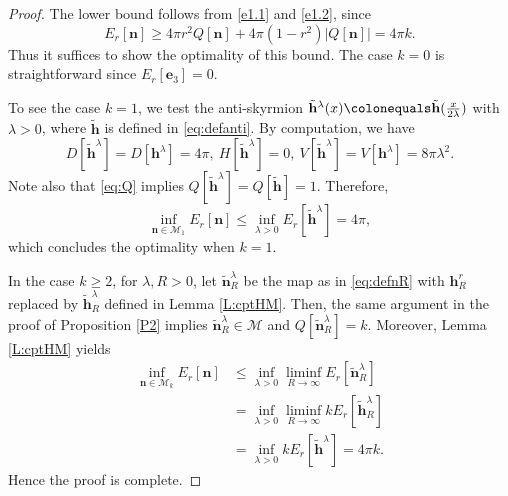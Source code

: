 \documentclass{amsart}
\numberwithin{equation}{section}
\theoremstyle{definition}
\theoremstyle{remark}
\newcommand{\boM}{\mathcal{M}}
\newcommand{\la}{\ensuremath{\lambda}}
\newcommand{\te}{\ensuremath{\theta}}
\newcommand{\bh}{{\mathbf{h}}}
\newcommand{\bn}{{\mathbf{n}}}
\newcommand{\boe}{{\mathbf{e}}}
\begin{document}
\begin{proof}
The lower bound follows from 
\eqref{e1.1} and \eqref{e1.2}, since
$$
E_r[\bn] \ge 4\pi r^2 Q[\bn] + 4\pi (1-r^2) |Q[\bn]| = 4\pi k.
$$
Thus it suffices to show the optimality of this bound.
The case $k=0$ is straightforward since $E_r[\boe_3]=0$.

To see the case $k=1$, 
we test the anti-skyrmion $\tilde{\bh}^\lambda(x)\colonequals\tilde{\bh}(\frac{x}{2\lambda})$ with $\la>0$, where $\tilde\bh$ is defined in \eqref{eq:defanti}. 
By computation, we have
\[ D[\tilde{\bh}^\lambda]=D[\bh^\lambda]=4\pi,\ H[\tilde{\bh}^\lambda]=0,\ V[\tilde{\bh}^\lambda]=V[\bh^\lambda]=8\pi \lambda^2.
\]
Note also that \eqref{eq:Q} implies
$
Q[\tilde{\bh}^\lambda]=Q[\tilde{\bh}]=1.
$
Therefore,
$$
\inf_{\bn\in\boM_1} E_r[\bn] 
\le \inf_{\la>0} E_r[\tilde\bh^\la] = 4\pi,
$$
which concludes the optimality when $k=1$. 

In the case $k\ge 2$, for $\la,R>0$, 
let $\tilde{\bn}^\la_R$ be the map as in \eqref{eq:defnR} with $\bh^r_R$ replaced by $\tilde\bh^\la_R$ defined in Lemma \ref{L:cptHM}. Then, the same argument in the proof of Proposition \ref{P2} implies $\tilde\bn_R^\la\in\boM$ and $Q[\tilde\bn_R^\la]=k$. Moreover, Lemma \ref{L:cptHM} yields
\begin{align*}
\inf_{\bn\in\boM_{k}} E_r[\bn] 
&\le  
\inf_{\la>0} \liminf_{R\to\infty} E_r[\tilde\bn^{\la}_R] \\
&= \inf_{\la>0} \liminf_{R\to\infty} k E_r[\tilde\bh_R^\la]\\
&= \inf_{\la>0}kE_r[\tilde\bh^\la]= 
4\pi k.
\end{align*}
Hence the proof is complete.
\end{proof}
\end{document}
